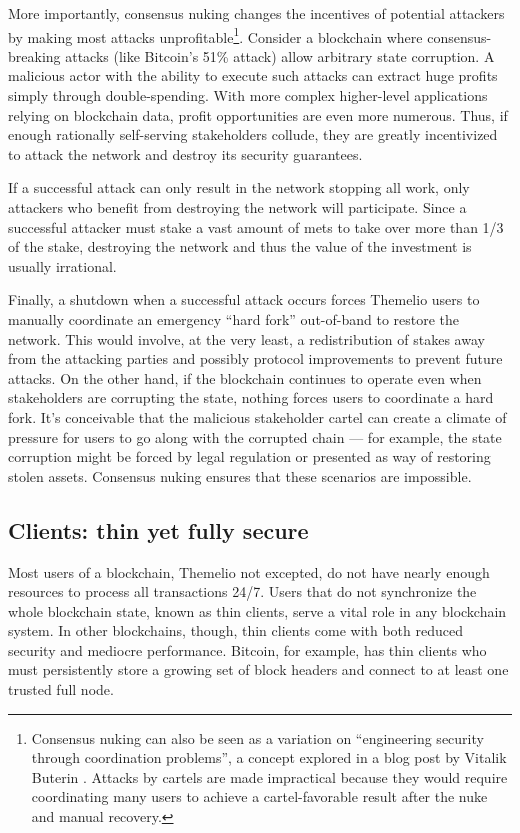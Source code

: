 \documentclass[headinclude]{scrbook}
\begin{document}
More importantly, consensus nuking changes the incentives of potential attackers by making most attacks unprofitable\footnote{Consensus nuking can also be seen as a variation on ``engineering security through coordination problems'', a concept explored in a blog post by Vitalik Buterin \cite{buterin2017coordination}. Attacks by cartels are made impractical because they would require coordinating many users to achieve a cartel-favorable result after the nuke and manual recovery.}. Consider a blockchain where consensus-breaking attacks (like Bitcoin's 51\% attack) allow arbitrary state corruption. A malicious actor with the ability to execute such attacks can extract huge profits simply through double-spending. With more complex higher-level applications relying on blockchain data, profit opportunities are even more numerous. Thus, if enough rationally self-serving stakeholders collude, they are greatly incentivized to attack the network and destroy its security guarantees.

If a successful attack can only result in the network stopping all work, only attackers who benefit from destroying the network will participate. Since a successful attacker must stake a vast amount of mets to take over more than 1/3 of the stake, destroying the network and thus the value of the investment is usually irrational.

Finally, a shutdown when a successful attack occurs forces Themelio users to manually coordinate an emergency ``hard fork'' out-of-band to restore the network. This would involve, at the very least, a redistribution of stakes away from the attacking parties and possibly protocol improvements to prevent future attacks. On the other hand, if the blockchain continues to operate even when stakeholders are corrupting the state, nothing forces users to coordinate a hard fork. It's conceivable that the malicious stakeholder cartel can create a climate of pressure for users to go along with the corrupted chain --- for example, the state corruption might be forced by legal regulation or presented as way of restoring stolen assets. Consensus nuking ensures that these scenarios are impossible.

\subsection{Clients: thin yet fully secure}

Most users of a blockchain, Themelio not excepted, do not have nearly enough resources to process all transactions 24/7. Users that do not synchronize the whole blockchain state, known as thin clients, serve a vital role in any blockchain system. In other blockchains, though, thin clients come with both reduced security and mediocre performance. Bitcoin, for example, has thin clients who must persistently store a growing set of block headers and connect to at least one trusted full node.
\end{document}
